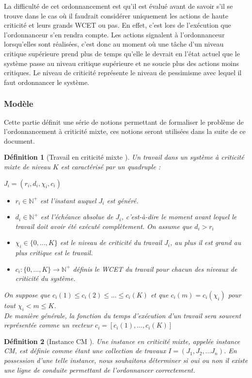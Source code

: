 \documentclass[a4paper]{report}
\theoremstyle{break}
\newtheorem{defin}{Définition}
\theoremstyle{breakplain}
\begin{document}
La difficulté de cet ordonnancement est qu'il est évalué avant de savoir s'il se trouve dans le cas où il faudrait considérer uniquement les actions de haute criticité et leurs grands WCET ou pas. En effet, c'est lors de l'exécution que l'ordonnanceur s'en rendra compte. Les actions signalent à l'ordonnanceur lorsqu'elles sont réalisées, c'est donc au moment où une tâche d'un niveau critique supérieure prend plus de temps qu'elle le devrait en l'état actuel que le système passe au niveau critique supérieure et ne soucie plus des actions moins critiques. Le niveau de criticité représente le niveau de pessimisme avec lequel il faut ordonnancer le système. 

\subsubsection{Modèle}
Cette partie définit une série de notions permettant de formaliser le problème de l'ordonnancement à criticité mixte, ces notions seront utilisées dans la suite de ce document.

\begin{defin}[Travail en criticité mixte \cite{BaruahBDMSS11}]
Un travail dans un système à criticité mixte de niveau $K$ est caractérisé par un quadruple : 
\begin{center}
 $J_i = (r_i, d_i, \chi_i, c_i)$ 
\end{center}
\begin{itemize}
\item $r_i \in \mathbb{N}^{+}$ est l'instant auquel $J_i$ est généré.
\item $d_i \in \mathbb{N}^{+}$ est l'échéance absolue de $J_i$, c'est-à-dire le moment avant lequel le travail doit avoir été exécuté complètement. On assume que $d_i > r_i$
\item $\chi_i \in \{0, ..., K\}$ est le niveau de criticité du travail $J_i$, au plus il est grand au plus critique est le travail.
\item $c_i : \{0, ..., K\} \rightarrow \mathbb{N}^{+}$ définis le WCET du travail pour chacun des niveaux de criticité du système.
\end{itemize}
On suppose que $c_i(1) \leq c_i(2) \leq ... \leq c_i(K)$ et que $c_i(m) = c_i(\chi_i)$ pour tout $\chi_i < m \leq K$.\\
De manière générale, la fonction du temps d'exécution d'un travail sera souvent représentée comme un vecteur $c_i = [c_i(1), ..., c_i(K)]$
\end{defin}
\begin{defin}[Instance CM \cite{baruah2010towards}]
Une instance en criticité mixte, appelée instance CM, est définie comme étant une collection de travaux $I = (J_1, J_2, ... J_n)$. En possession d'une telle instance, nous souhaitons déterminer si oui ou non il existe une ligne de conduite permettant de l'ordonnancer correctement.
\end{defin}
\end{document}
